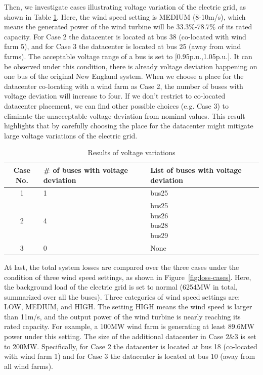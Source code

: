 Then, we investigate cases illustrating voltage variation of the electric grid, as shown in Table \ref{tab:results-volvio}. Here, the wind speed setting is MEDIUM (8-10m/s), which means the generated power of the wind turbine will be 33.3\%-78.7\% of its rated capacity. For Case 2 the datacenter is located at bus 38 (co-located with wind farm 5), and for Case 3 the datacenter is located at bus 25 (away from wind farms). The acceptable voltage range of a bus is set to [0.95p.u.,1.05p.u.]. It can be observed under this condition, there is already voltage deviation happening on one bus of the original New England system. When we choose a place for the datacenter co-locating with a wind farm as Case 2, the number of buses with voltage deviation will increase to four. If we don't restrict to co-located datacenter placement, we can find other possible choices (e.g. Case 3) to eliminate the unacceptable voltage deviation from nominal values. This result highlights that by carefully choosing the place for the datacenter might mitigate large voltage variations of the electric grid.

\begin{table}[ht]
\begin{center}
\caption{Results of voltage variations}
\begin{tabular}{|c|p{1in}|p{1in}|}
\hline
Case No. & \# of buses with voltage deviation & List of buses with voltage deviation  \\
\hline
1 & 1 & bus25\\
\hline
2 & 4 & \tabincell{c}{bus25\\bus26\\bus28\\bus29}\\
\hline
3 & 0 & None \\

\hline

\end{tabular}
\label{tab:results-volvio}
\end{center}
\vspace{-0.25in}
\end{table}

At last, the total system losses are compared over the three cases under the condition of three wind speed settings, as shown in Figure~\ref{fig:loss-cases}. Here, the background load of the electric grid is set to normal (6254MW in total, summarized over all the buses). Three categories of wind speed settings are: LOW, MEDIUM, and HIGH. The setting HIGH means the wind speed is larger than 11m/s, and the output power of the wind turbine is nearly reaching its rated capacity. For example, a 100MW wind farm is generating at least 89.6MW power under this setting. The size of the additional datacenter in Case 2\&3 is set to 200MW. Specifically, for Case 2 the datacenter is located at bus 18 (co-located with wind farm 1) and for Case 3 the datacenter is located at bus 10 (away from all wind farms).

